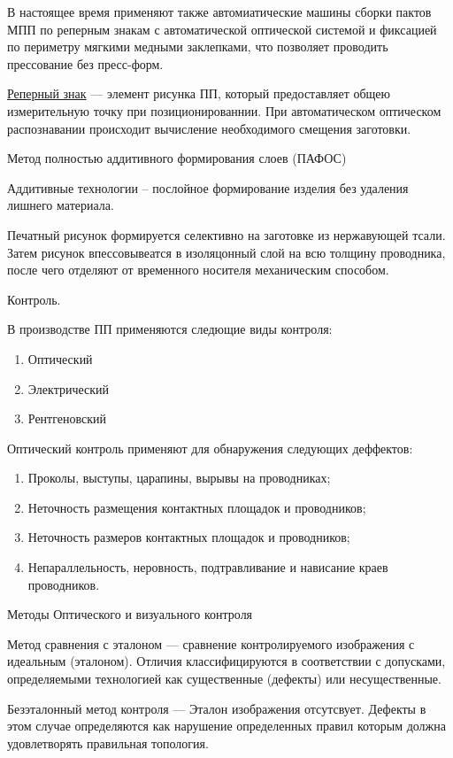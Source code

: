 \documentclass{article}
\begin{document}
В настоящее время применяют также автомиатические машины сборки пактов МПП по реперным знакам с автоматической оптической системой и фиксацией по периметру мягкими медными заклепками, что позволяет проводить прессование без пресс-форм.

\underline{Реперный знак}  --- элемент рисунка ПП, который предоставляет общею измерительную точку при позиционированнии. При автоматическом оптическом распознавании происходит вычисление необходимого смещения заготовки.

Метод полностью аддитивного формирования слоев (ПАФОС)

Аддитивные технологии -- послойное формирование изделия без удаления лишнего материала.

Печатный рисунок формируется селективно на заготовке из нержавующей тсали. Затем рисунок впессовывеатся в изоляцонный слой на всю толщину проводника, после чего отделяют от временного носителя механическим способом.

Контроль.

В производстве ПП применяются следющие виды контроля:
\begin{enumerate}
	\item Оптический
	\item Электрический
	\item Рентгеновский
\end{enumerate}

Оптический контроль применяют для обнаружения следующих деффектов:
\begin{enumerate}
	\item Проколы, выступы, царапины, вырывы на проводниках;
	\item Неточность размещения контактных площадок и проводников;
	\item Неточность размеров контактных площадок и проводников;
	\item Непараллельность, неровность, подтравливание и нависание краев проводников.
\end{enumerate}

Методы Оптического и визуального контроля

Метод сравнения с эталоном --- сравнение контролируемого изображения с идеальным (эталоном). Отличия классифицируются в соответствии с допусками, определяемыми технологией как существенные (дефекты) или несущественные.

Безэталонный метод контроля --- Эталон изображения отсутсвует. Дефекты в этом случае определяются как нарушение определенных правил которым должна удовлетворять правильная топология.
\end{document}
